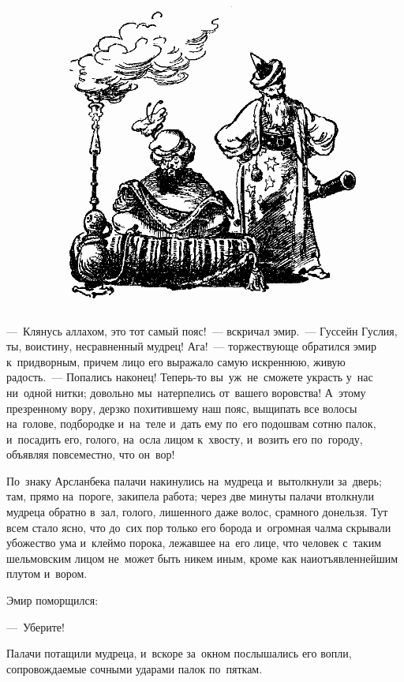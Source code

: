 \documentclass[12pt,a4paper]{book}
\begin{document}
\begin{figure}[h]
\centering
\includegraphics[width=\textwidth]{13.png}
\end{figure}

—~Клянусь аллахом, это тот самый пояс!~— вскричал эмир.~— Гуссейн Гуслия, ты, воистину, несравненный мудрец! Ага!~— торжествующе обратился эмир к~придворным, причем лицо его выражало самую искреннюю, живую радость.~— Попались наконец! Теперь-то вы~уж~не~сможете украсть у~нас ни~одной нитки; довольно мы~натерпелись от~вашего воровства! А~этому презренному вору, дерзко похитившему наш пояс, выщипать все волосы на~голове, подбородке и~на~теле и~дать ему по~его подошвам сотню палок, и~посадить его, голого, на~осла лицом к~хвосту, и~возить его по~городу, объявляя повсеместно, что он~вор!

По~знаку Арсланбека палачи накинулись на~мудреца и~вытолкнули за~дверь; там, прямо на~пороге, закипела работа; через две минуты палачи втолкнули мудреца обратно в~зал, голого, лишенного даже волос, срамного донельзя. Тут всем стало ясно, что до~сих пор только его борода и~огромная чалма скрывали убожество ума и~клеймо порока, лежавшее на~его лице, что человек с~таким шельмовским лицом не~может быть никем иным, кроме как наиотъявленнейшим плутом и~вором.

Эмир поморщился:

—~Уберите!

Палачи потащили мудреца, и~вскоре за~окном послышались его вопли, сопровождаемые сочными ударами палок по~пяткам.
\end{document}
